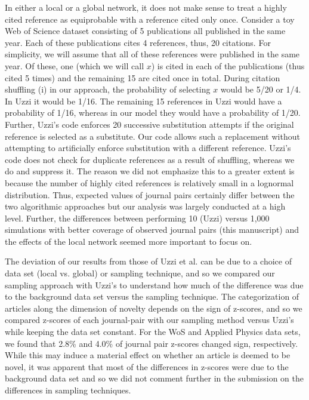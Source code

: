 \documentclass[11pt, oneside]{article}   	%
\begin{document}
In either a local or a global network, it does not make sense to treat a highly cited reference as equiprobable with a reference cited only once. Consider a toy Web of Science dataset consisting of 5 publications all published in the same year. Each of these publications cites 4 references, thus, 20 citations. For simplicity, we will assume that all of these references were published in the same year. Of these, one (which we will call $x$) is cited in each of the publications (thus cited 5 times) and the remaining 15 are cited once in total. During citation shuffling (i)  in our approach, the probability of selecting $x$ would be 5/20 or 1/4. In Uzzi it would be 1/16. The remaining 15 references in Uzzi would have a probability of 1/16, whereas in our model they would have a probability of 1/20. Further, Uzzi's code enforces 20 successive substitution attempts if the original reference is selected as a substitute. Our code allows such a replacement without attempting to artificially enforce substitution with a different reference. Uzzi's code does not check for duplicate references as a result of shuffling, whereas we do and suppress it. The reason we did not emphasize this to a greater extent is because the number of highly cited references is relatively small in a lognormal distribution. Thus, expected values of journal pairs certainly differ between the two algorithmic approaches but our analysis was largely conducted at a high level. Further, the differences between performing 10 (Uzzi) versus 1,000 simulations with better coverage of observed journal pairs (this manuscript) and the effects of the local network seemed more important to focus on. 

The deviation of our results from those of Uzzi et al. can be due to a choice of data set (local vs. global) or sampling technique, and so we compared our sampling approach with Uzzi's to understand how much of the difference was due to the background data set versus the sampling technique. The categorization of articles along the dimension of novelty depends on the sign of z-scores, and so we compared z-scores of each journal-pair with our sampling method versus Uzzi's while keeping  the data set constant.  For the WoS and Applied Physics data sets, we found that 2.8\% and 4.0\% of journal pair z-scores changed sign, respectively.  While this may induce a material effect on whether an article is deemed to be novel, it was apparent that most of the differences in z-scores were due to the background data set and so we did not comment further in the submission on the differences in sampling techniques.
\end{document}
